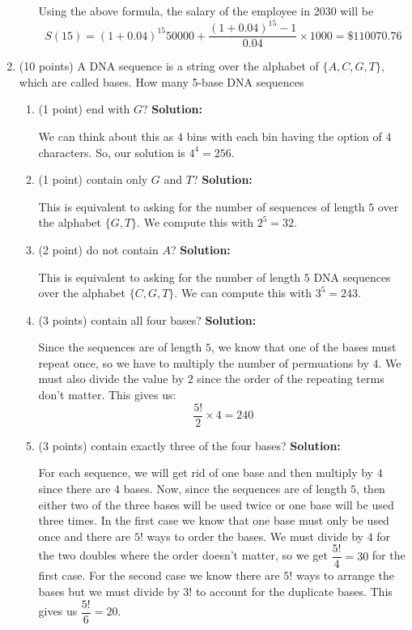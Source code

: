 \documentclass[11pt]{article}
\begin{document}
\begin{enumerate}
\begin{itemize}
Using the above formula, the salary of the employee in 2030 will be 
$$ S(15) = (1 + 0.04)^{15}50000 + \dfrac{(1 + 0.04)^{15} - 1}{0.04} \times 1000 = \$110070.76 $$

\end{itemize}

\item (10 points) 
A DNA sequence is a string over the alphabet of $\{A, C, G, T\}$, 
which are called bases. How many 5-base DNA sequences
\begin{enumerate}
\item (1 point) end with $G$? 
\textbf{Solution: }

We can think about this as $4$ bins with each bin having the option of $4$ characters.
So, our solution is $4^4 = 256$.  

\item (1 point) contain only $G$ and $T$? 
\textbf{Solution: }

This is equivalent to asking for the number of sequences of length $5$ over the alphabet $\{G,T\}$.  
We compute this with $2^5= 32$.  

\item (2 point) do not contain $A$? 
\textbf{Solution: }

This is equivalent to asking for the number of length $5$ DNA sequences over the alphabet $\{C,G,T\}$.  
We can compute this with $3^5 = 243$.  

\item (3 points) contain all four bases? 
\textbf{Solution: }

Since the sequences are of length $5$, we know that one of the bases must repeat once, so we have to multiply the number of permuations by $4$.  We must also divide the value by $2$ since the order of the repeating terms don't matter.  This gives us:
$$ \dfrac{5!}{2} \times 4 = 240 $$

\item (3 points) contain exactly three of the four bases?
\textbf{Solution: }

For each sequence, we will get rid of one base and then multiply by $4$ since there are $4$ bases.  Now, since the sequences are of length $5$, then either two of the three bases will be used twice or one base will be used three times.  In the first case we know that one base must only be used once and there are $5!$ ways to order the bases.  We must divide by $4$ for the two doubles where the order doesn't matter, so we get $\dfrac{5!}{4} = 30$ for the first case.  
For the second case we know there are $5!$ ways to arrange the bases but we must divide by $3!$ to account for the duplicate bases.  This gives us $\dfrac{5!}{6} = 20$.  


\end{enumerate}
\end{enumerate}
\end{document}

